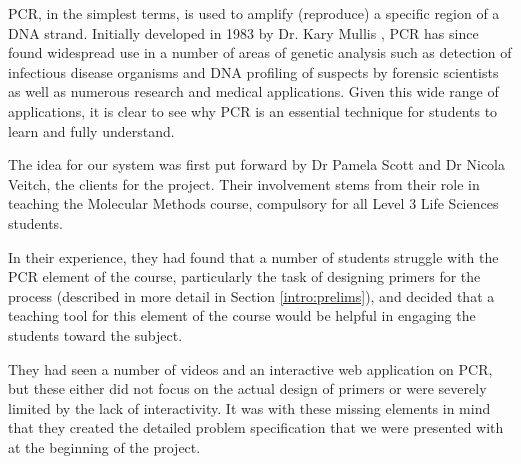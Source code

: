 
PCR, in the simplest terms, is used to amplify (reproduce) a specific region of a 
DNA strand. Initially developed in 1983 by Dr. Kary Mullis \cite{shortHistory}, 
PCR has since found widespread use in a number of areas of genetic analysis such as 
detection of infectious disease organisms \cite{hiv} and DNA profiling of suspects 
by forensic scientists as well as numerous research and medical applications. 
Given this wide range of applications, it is clear to see why PCR is an essential 
technique for students to learn and fully understand.

The idea for our system was first put forward by Dr Pamela Scott and Dr
Nicola Veitch, the clients for the project. Their involvement stems from 
their role in teaching the Molecular Methods course, compulsory for all 
Level 3 Life Sciences students. 

In their experience, they had found that a number of students struggle with the 
PCR element of the course, particularly the task of designing primers for the 
process (described in more detail in Section \ref{intro:prelims}), and decided 
that a teaching tool for this element of the course would be helpful in engaging 
the students toward the subject. 

They had seen a number of videos and an interactive web application on PCR, but these 
either did not focus on the actual design of primers or were severely limited by the 
lack of interactivity. It was with these missing elements in mind that they created 
the detailed problem specification that we were presented with at the beginning of 
the project.
